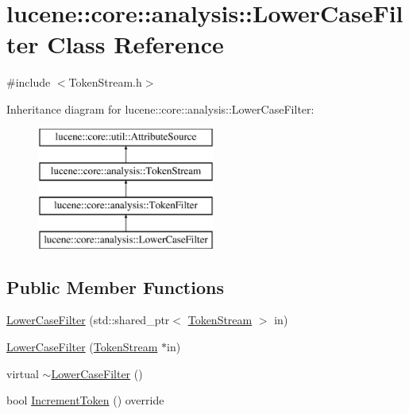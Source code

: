 \hypertarget{classlucene_1_1core_1_1analysis_1_1LowerCaseFilter}{}\section{lucene\+:\+:core\+:\+:analysis\+:\+:Lower\+Case\+Filter Class Reference}
\label{classlucene_1_1core_1_1analysis_1_1LowerCaseFilter}


{\ttfamily \#include $<$Token\+Stream.\+h$>$}

Inheritance diagram for lucene\+:\+:core\+:\+:analysis\+:\+:Lower\+Case\+Filter\+:\begin{figure}[H]
\begin{center}
\leavevmode
\includegraphics[height=4.000000cm]{classlucene_1_1core_1_1analysis_1_1LowerCaseFilter}
\end{center}
\end{figure}
\subsection*{Public Member Functions}
\begin{DoxyCompactItemize}
\item 
\mbox{\hyperlink{classlucene_1_1core_1_1analysis_1_1LowerCaseFilter_adc40b1a46dae685f8fded193589a8564}{Lower\+Case\+Filter}} (std\+::shared\+\_\+ptr$<$ \mbox{\hyperlink{classlucene_1_1core_1_1analysis_1_1TokenStream}{Token\+Stream}} $>$ in)
\item 
\mbox{\hyperlink{classlucene_1_1core_1_1analysis_1_1LowerCaseFilter_a9c099f0524d658bf260086b572831233}{Lower\+Case\+Filter}} (\mbox{\hyperlink{classlucene_1_1core_1_1analysis_1_1TokenStream}{Token\+Stream}} $\ast$in)
\item 
virtual \mbox{\hyperlink{classlucene_1_1core_1_1analysis_1_1LowerCaseFilter_a0f7565bddace8d24ef778bc34bb4eeb4}{$\sim$\+Lower\+Case\+Filter}} ()
\item 
bool \mbox{\hyperlink{classlucene_1_1core_1_1analysis_1_1LowerCaseFilter_a0e32bf7c330bccfb7ad3c68a374683a7}{Increment\+Token}} () override
\end{DoxyCompactItemize}
